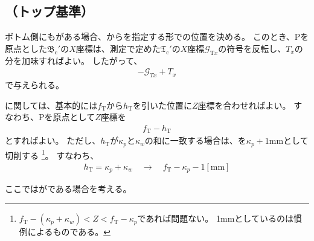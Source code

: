 \subsection{\BottomOutcutCenter（トップ基準）}
ボトム側にも\Outcut がある場合、\TopOutcutCenter から\CenterlineEndFaceDifAC を指定する形で\BottomOutcutCenter の位置を決める。
このとき、\TableCenter Pを原点とした\BottomOutcutCenter$\mathfrak B_\mathrm c'$の$X$座標は、測定で定めた$\mathfrak T_\mathrm c'$の$X$座標$\mathcal G_{\mathrm Tx}$の符号を反転し、\CenterlineEndFaceDifAC$T_x$の分を加味すればよい。
したがって、
\begin{align}
  \label{eq:TbasedTx}
  -\mathcal G_{Tx}+T_x
\end{align}
で与えられる。



\clearpage
\modHeadsection{\TopOutcutLength}
\TopOutcutLength に関しては、基本的には\AlocationLength$f_\mathrm T$から\TopOutcutLength$h_\mathrm T$を引いた位置に$Z$座標を合わせればよい。
すなわち、\TableCenter Pを原点として$Z$座標を
\begin{align*}
  f_\mathrm T - h_\mathrm T
\end{align*}
とすればよい。
ただし、\TopOutcutLength$h_\mathrm T$が\KeywayPos$\kappa_p$と\KeywayWidth$\kappa_w$の和に一致する場合は、\TopOutcutLength を$\kappa_p+1$mmとして切削する
\footnote{$f_\mathrm T-(\kappa_p+\kappa_w) < Z < f_\mathrm T-\kappa_p$であれば問題ない。
1mmとしているのは慣例によるものである。}。
すなわち、
\begin{align*}
  h_\mathrm T = \kappa_p+\kappa_w \quad \longrightarrow \quad f_\mathrm T-\kappa_p-1[\mathrm{mm}]
\end{align*}



\clearpage
ここでは\Outcut が\CurvedOutcut である場合を考える。


